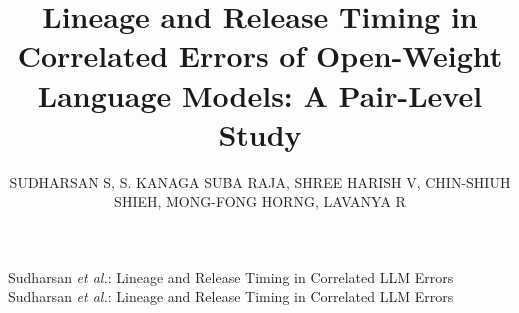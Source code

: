 \documentclass{ieeeaccess}
\theoremstyle{definition}
\theoremstyle{plain}
\begin{document}

\title{Lineage and Release Timing in Correlated Errors of Open-Weight Language Models: A Pair-Level Study}

\author{\uppercase{Sudharsan S},
\uppercase{S. Kanaga Suba Raja},
\uppercase{Shree Harish V},
\uppercase{Chin-Shiuh Shieh},
\uppercase{Mong-Fong Horng},
\uppercase{Lavanya R}}

\address[1]{Department of Computer Science and Engineering, SRM Institute of
Science and Technology, Tiruchirappalli 620101, India}

\address[2]{Research Institute of IoT Cybersecurity, Department of Electrical
Engineering, National Kaohsiung University of Science and Technology,
Kaohsiung 824, Taiwan, ROC}

\address[3]{Department of Computer Science and Engineering (Big Data Analytics),
SRM Institute of Science and Technology,
Tiruchirappalli 620101, India}

\markboth
{Sudharsan \emph{et al.}: Lineage and Release Timing in Correlated LLM Errors}
{Sudharsan \emph{et al.}: Lineage and Release Timing in Correlated LLM Errors}

\end{document}
